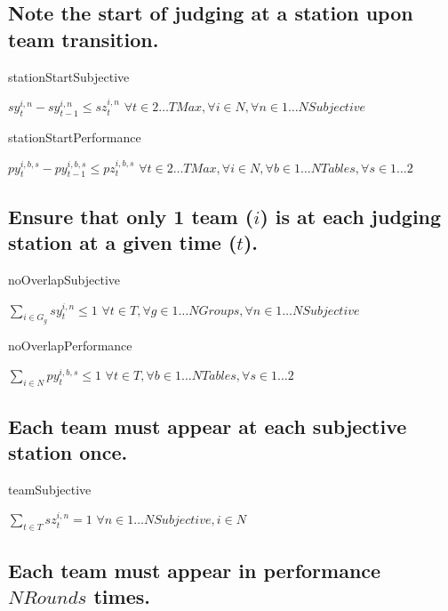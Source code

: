 \documentclass[letterpaper,11pt]{report}
\begin{document}
\FloatBarrier
\subsection{Note the start of judging at a station upon team transition.}
\begin{algorithm}
\caption{stationStartSubjective}
$sy_{t}^{i,n} - sy_{t-1}^{i,n} \le sz_{t}^{i,n}$
\hfill $\forall t \in {2 \dots TMax}, \forall i \in N,
\forall n \in 1 \dots NSubjective$
\end{algorithm}

\begin{algorithm}
\caption{stationStartPerformance}
$py_{t}^{i,b,s} - py_{t-1}^{i,b,s} \le pz_{t}^{i,b,s}$
\hfill $\forall t \in {2 \dots TMax}, \forall i \in N, \forall b \in {1 \dots NTables},
\forall s \in 1 \dots 2$
\end{algorithm}


\FloatBarrier
\subsection{Ensure that only 1 team ($i$) is at each judging station at a
given time ($t$).}
\label{judging_group_constraint}

\begin{algorithm}
\caption{noOverlapSubjective}
$\sum\limits_{i \in G_{g}} sy_{t}^{i,n} \le 1$          
\hfill $\forall t \in T, \forall g \in 1 \dots NGroups,
\forall n \in 1 \dots NSubjective$
\end{algorithm}

\begin{algorithm}
\caption{noOverlapPerformance}
$\sum\limits_{i \in N} py_{t}^{i,b,s} \le 1$          
\hfill $\forall t \in T, \forall b \in 1 \dots NTables,
\forall s \in 1 \dots 2$
\end{algorithm}


\FloatBarrier
\subsection{Each team must appear at each subjective station once.}

\begin{algorithm}
\caption{teamSubjective}
$\sum\limits_{t \in T} sz_{t}^{i,n} = 1$
\hfill $\forall n \in 1 \dots NSubjective, i \in N$
\end{algorithm}


\FloatBarrier
\subsection{Each team must appear in performance $NRounds$ times.}
\end{document}
